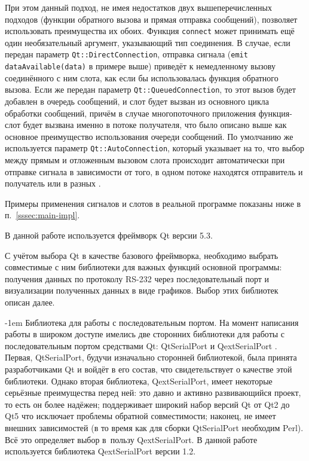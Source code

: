 \documentclass[a4paper, 14pt, titlepage]{extarticle}
\makeatletter
\newcommand{\inlinecode}[1]{\lstinline[basicstyle=\ttfamily]{#1}}
\renewcommand{\paragraph}{%
    \@startsection{paragraph}{4}%
    {\parindent}{\z@}{-1em}%
    {\normalfont\normalsize\bfseries}%
  }
\makeatother
\begin{document}
  При этом данный подход, не имея недостатков двух вышеперечисленных подходов (функции обратного
  вызова и прямая отправка сообщений), позволяет использовать преимущества их обоих. Функция
  \inlinecode{connect} может принимать ещё один необязательный аргумент, указывающий тип соединения.
  В случае, если передан параметр \inlinecode{Qt::DirectConnection}, отправка сигнала
  (\inlinecode{emit dataAvailable(data)} в примере выше) приведёт к немедленному вызову соединённого
  с ним слота, как если бы использовалась функция обратного вызова.  Если же передан параметр
  \inlinecode{Qt::QueuedConnection}, то этот вызов будет добавлен в очередь сообщений, и слот будет
  вызван из основного цикла обработки сообщений, причём в случае многопоточного приложения
  функция-слот будет вызвана именно в потоке получателя, что было описано выше как основное
  преимущество использования очереди сообщений. По умолчанию же используется параметр
  \inlinecode{Qt::AutoConnection}, который указывает на то, что выбор между прямым и отложенным
  вызовом слота происходит автоматически при отправке сигнала в зависимости от того, в одном
  потоке находятся отправитель и получатель или в разных \cite{qt-connection-type}.

  Примеры применения сигналов и слотов в реальной программе показаны ниже в п.~\ref{sssec:main-impl}.

  В данной работе используется фреймворк Qt версии 5.3.

  С учётом выбора Qt в качестве базового фреймворка, необходимо выбрать совместимые с ним библиотеки
  для важных функций основной программы: получения данных по протоколу RS-232 через последовательный
  порт и визуализации полученных данных в виде графиков. Выбор этих библиотек описан далее.

  \paragraph{Библиотека для работы с последовательным портом.}
  На момент написания работы в широком доступе имелись две сторонних библиотеки для работы с
  последовательным портом средствами Qt: QtSerialPort \cite{qtserialport} и QextSerialPort \cite{qextserialport}.
  Первая, QtSerialPort, будучи изначально сторонней библиотекой, была принята разработчиками Qt и
  войдёт в его состав, что свидетельствует о качестве этой библиотеки. Однако вторая
  библиотека, QextSerialPort, имеет некоторые серьёзные преимущества перед ней: это давно и активно
  развивающийся проект, то есть он более надёжен; поддерживает широкий набор версий Qt от Qt2 до Qt5
  что исключает проблемы обратной совместимости; наконец, не имеет внешних зависимостей (в то время
  как для сборки QtSerialPort необходим Perl). Всё это определяет выбор в~пользу QextSerialPort.
  В данной работе используется библиотека QextSerialPort версии 1.2.
\end{document}
